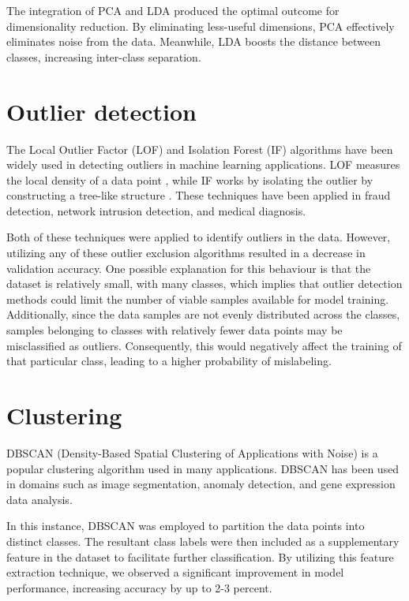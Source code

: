 \documentclass[conference]{IEEEtran}
\begin{document}
The integration of PCA and LDA produced the optimal outcome for dimensionality reduction. By eliminating less-useful dimensions, PCA effectively eliminates noise from the data. Meanwhile, LDA boosts the distance between classes, increasing inter-class separation.


\section{Outlier detection}

The Local Outlier Factor (LOF) and Isolation Forest (IF) algorithms have been widely used in detecting outliers in machine learning applications. LOF measures the local density of a data point \cite{lof}, while IF works by isolating the outlier by constructing a tree-like structure \cite{iso_for}. These techniques have been applied in fraud detection, network intrusion detection, and medical diagnosis.

Both of these techniques were applied to identify outliers in the data. However, utilizing any of these outlier exclusion algorithms resulted in a decrease in validation accuracy. One possible explanation for this behaviour is that the dataset is relatively small, with many classes, which implies that outlier detection methods could limit the number of viable samples available for model training. Additionally, since the data samples are not evenly distributed across the classes, samples belonging to classes with relatively fewer data points may be misclassified as outliers. Consequently, this would negatively affect the training of that particular class, leading to a higher probability of mislabeling.





\section{Clustering}
DBSCAN (Density-Based Spatial Clustering of Applications with Noise) is a popular clustering algorithm used in many applications. DBSCAN has been used in domains such as image segmentation, anomaly detection, and gene expression data analysis.

In this instance, DBSCAN was employed to partition the data points into distinct classes. The resultant class labels were then included as a supplementary feature in the dataset to facilitate further classification. By utilizing this feature extraction technique, we observed a significant improvement in model performance, increasing accuracy by up to 2-3 percent.
\end{document}
